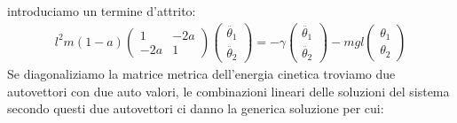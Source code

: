 introduciamo un termine d'attrito:
\begin{equation*}
	\begin{gathered}
		l^2m(1-a)
		\begin{pmatrix}
			1 & -2a \\
			-2a & 1
		\end{pmatrix}
		\begin{pmatrix}
			\ddot{\theta_1} \\
			\ddot{\theta_2}
		\end{pmatrix}
		=-\gamma
			\begin{pmatrix}
			\ddot{\theta_1} \\
			\ddot{\theta_2}
		\end{pmatrix}
		-mgl
		\begin{pmatrix}
			\theta_1 \\
			\theta_2
		\end{pmatrix}
	\end{gathered}	
\end{equation*}
Se diagonaliziamo la matrice metrica dell'energia cinetica troviamo due autovettori con due auto valori, le combinazioni lineari delle soluzioni del sistema secondo questi due autovettori ci danno la generica soluzione per cui:
